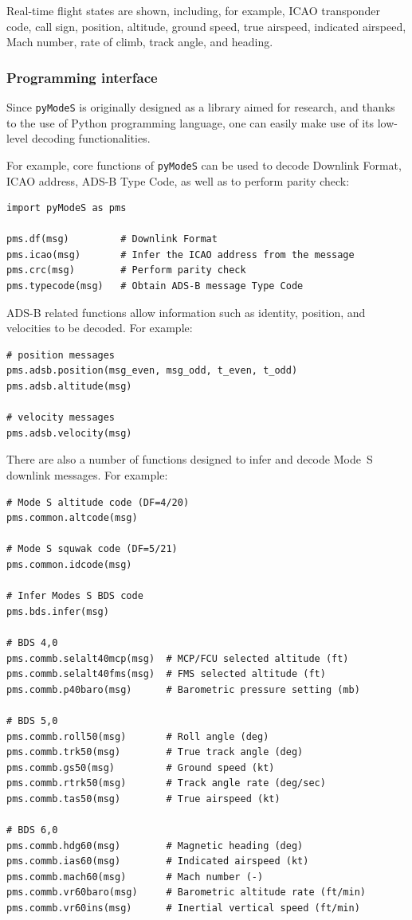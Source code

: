 Real-time flight states are shown, including, for example, ICAO transponder code, call sign, position,  altitude, ground speed, true airspeed, indicated airspeed, Mach number, rate of climb, track angle, and heading.

\subsubsection{Programming interface}

Since \texttt{pyModeS} is originally designed as a library aimed for research, and thanks to the use of Python programming language, one can easily make use of its low-level decoding functionalities.

For example, core functions of \texttt{pyModeS} can be used to decode Downlink Format, ICAO address, ADS-B Type Code, as well as to perform parity check:

\begin{verbatim}
import pyModeS as pms

pms.df(msg)         # Downlink Format
pms.icao(msg)       # Infer the ICAO address from the message
pms.crc(msg)        # Perform parity check
pms.typecode(msg)   # Obtain ADS-B message Type Code
\end{verbatim}


ADS-B related functions allow information such as identity, position, and velocities to be decoded. For example:

\begin{verbatim}
# position messages
pms.adsb.position(msg_even, msg_odd, t_even, t_odd)
pms.adsb.altitude(msg)

# velocity messages
pms.adsb.velocity(msg)
\end{verbatim}

There are also a number of functions designed to infer and decode Mode~S downlink messages. For example:

\begin{verbatim}
# Mode S altitude code (DF=4/20)
pms.common.altcode(msg)

# Mode S squwak code (DF=5/21)
pms.common.idcode(msg)

# Infer Modes S BDS code
pms.bds.infer(msg)

# BDS 4,0
pms.commb.selalt40mcp(msg)  # MCP/FCU selected altitude (ft)
pms.commb.selalt40fms(msg)  # FMS selected altitude (ft)
pms.commb.p40baro(msg)      # Barometric pressure setting (mb)

# BDS 5,0
pms.commb.roll50(msg)       # Roll angle (deg)
pms.commb.trk50(msg)        # True track angle (deg)
pms.commb.gs50(msg)         # Ground speed (kt)
pms.commb.rtrk50(msg)       # Track angle rate (deg/sec)
pms.commb.tas50(msg)        # True airspeed (kt)

# BDS 6,0
pms.commb.hdg60(msg)        # Magnetic heading (deg)
pms.commb.ias60(msg)        # Indicated airspeed (kt)
pms.commb.mach60(msg)       # Mach number (-)
pms.commb.vr60baro(msg)     # Barometric altitude rate (ft/min)
pms.commb.vr60ins(msg)      # Inertial vertical speed (ft/min)
\end{verbatim}


